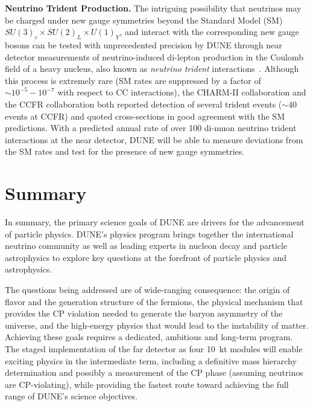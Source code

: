 {\bf Neutrino Trident Production.}
The intriguing possibility that neutrinos may be charged under new gauge symmetries beyond the Standard Model (SM) $SU(3)_c\times SU(2)_L\times U(1)_Y$, and interact with the corresponding new gauge bosons can be tested with unprecedented precision by DUNE through near detector measurements of neutrino-induced di-lepton production in the Coulomb field of a heavy nucleus, also known as {\it neutrino trident} interactions~\cite{Altmannshofer:2014pba}. Although this process is extremely rare (SM rates are suppressed by a factor of $\sim 10^{-5}-10^{-7}$ with respect to CC interactions), the CHARM-II collaboration \cite{Geiregat:1990gz} and the CCFR collaboration \cite{Mishra:1991bv} both reported detection of several trident events ($\sim 40$ events at CCFR) and quoted cross-sections in good agreement with the SM predictions. With a predicted annual rate of over 100 di-muon neutrino trident interactions at the near detector, DUNE will be able to measure deviations from the SM rates and test for the presence of new gauge symmetries.



\section{Summary}

In summary, the primary science goals of DUNE are drivers for the
advancement of particle physics. DUNE's physics program brings together the 
international neutrino community as well as leading experts in nucleon decay
and particle astrophysics to explore key questions at the forefront of
particle physics and astrophysics.

The questions being addressed are of wide-ranging consequence: the origin of flavor and the generation
structure of the fermions, the physical mechanism that provides the CP
violation needed to generate the baryon asymmetry of the universe, 
and the high-energy physics that would lead to the instability
of matter.  Achieving these goals requires a dedicated, ambitious and
long-term program.  
The staged implementation of
the far detector as four 10~kt modules will enable
exciting physics in the intermediate term, including a definitive mass
hierarchy determination and possibly a measurement of the CP phase 
(assuming neutrinos are CP-violating),  
while providing the fastest route toward achieving the
full range of DUNE's science objectives.  

